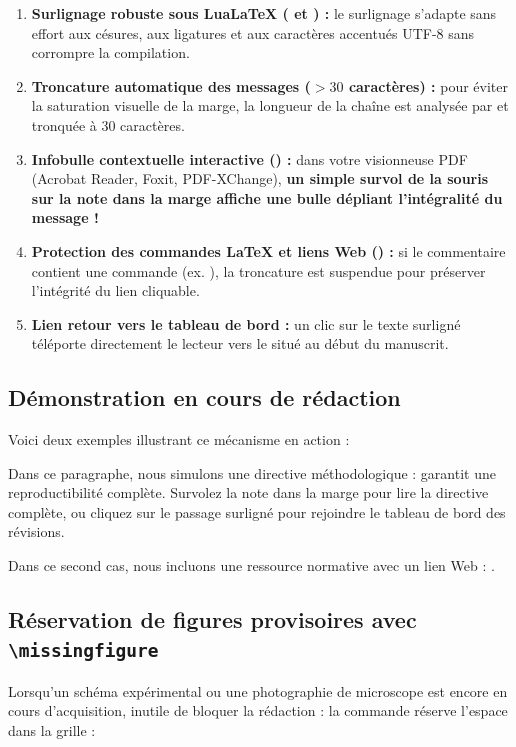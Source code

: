 \begin{enumerate}
  \item \textbf{Surlignage robuste sous Lua\LaTeX{} ( et ) :}
  le surlignage s'adapte sans effort aux césures, aux ligatures et aux caractères accentués UTF-8 sans corrompre la compilation.
  \item \textbf{Troncature automatique des messages ($> 30$ caractères) :}
  pour éviter la saturation visuelle de la marge, la longueur de la chaîne est analysée par  et tronquée à 30 caractères.
  \item \textbf{Infobulle contextuelle interactive () :}
  dans votre visionneuse PDF (Acrobat Reader, Foxit, PDF-XChange),
  \textbf{un simple survol de la souris sur la note dans la marge affiche une bulle dépliant l'intégralité du message !}
  \item \textbf{Protection des commandes \LaTeX{} et liens Web () :}
  si le commentaire contient une commande (ex. ), la troncature est suspendue pour préserver l'intégrité du lien cliquable.
  \item \textbf{Lien retour vers le tableau de bord :}
  un clic sur le texte surligné téléporte directement le lecteur vers le  situé au début du manuscrit.
\end{enumerate}

\subsection{Démonstration en cours de rédaction}
Voici deux exemples illustrant ce mécanisme en action :

Dans ce paragraphe, nous simulons une directive méthodologique :  garantit une reproductibilité complète.
Survolez la note dans la marge pour lire la directive complète, ou cliquez sur le passage surligné pour rejoindre le tableau de bord des révisions.

Dans ce second cas, nous incluons une ressource normative avec un lien Web : .

\subsection{Réservation de figures provisoires avec \texttt{\textbackslash missingfigure}}
Lorsqu'un schéma expérimental ou une photographie de microscope est encore en cours d'acquisition,
inutile de bloquer la rédaction : la commande  réserve l'espace dans la grille :

